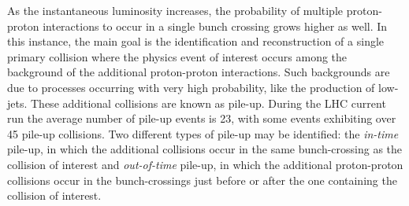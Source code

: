 As the instantaneous luminosity increases, the probability of multiple proton-proton interactions to occur in a single bunch crossing grows higher as well. In this instance, the main goal is the identification and reconstruction of a single primary collision where the physics event of interest occurs among the background of the additional proton-proton interactions. Such backgrounds are due to processes occurring with very high probability, like the production of low-\pt jets. These additional collisions are known as pile-up. During the LHC current run the average number of pile-up events is 23, with some events exhibiting over 45 pile-up collisions. Two different types of pile-up may be identified: the \emph{in-time} pile-up, in which the additional collisions occur in the same bunch-crossing as the collision of interest and \emph{out-of-time} pile-up, in which the additional proton-proton collisions occur in the bunch-crossings just before or after the one containing the collision of interest.











